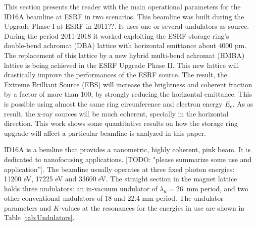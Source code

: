 \documentclass{iucr}              %
\newcommand{\todo}[1]{{\color{red}[TODO: "#1'']}}
\newcommand{\inred}[1]{{\color{red}#1}}
\begin{document}
This section presents the reader with the main operational parameters for the ID16A beamline at ESRF in two scenarios. This beamline was built during the Upgrade Phase I at ESRF in \inred{2011??}. It uses one or several undulators as source. During the period 2011-2018 it worked exploiting the ESRF storage ring’s double-bend achromat (DBA) lattice with horizontal emittance about 4000 pm. The replacement of this lattice by a new hybrid multi-bend achromat (HMBA) lattice is being achieved in the ESRF Upgrade Phase II. This new lattice will drastically improve the performances of the ESRF source. The result, the Extreme Brilliant Source (EBS) \cite{orangebook} will increase the brightness and coherent fraction by a factor of more than 100, by strongly reducing the horizontal emittance. This is possible using almost the same ring circunference and electron energy $E_e$. As as result, the x-ray sources will be much coherent, specially in the horizontal direction. This work shows some quantitative results on how the storage ring upgrade will affect a particular beamline is analyzed in this paper. 

ID16A \cite{ID16A} is a bemline that provides a nanometric, highly coherent, pink beam. It is dedicated to nanofocusing applications. \todo{please summarize some use and application}. The beamline usually operates at three fixed photon energies: 11200 eV, 17225 eV and 33600 eV. The straight section in the magnet lattice holds three undulators: an in-vacuum undulator of $\lambda_u=26$~mm period, and two other conventional undulators of 18 and 22.4 mm period. The undulator parameters and $K$-values at the resonances for the energies in use are shown in Table \ref{tab:Undulators}. 
\end{document}
